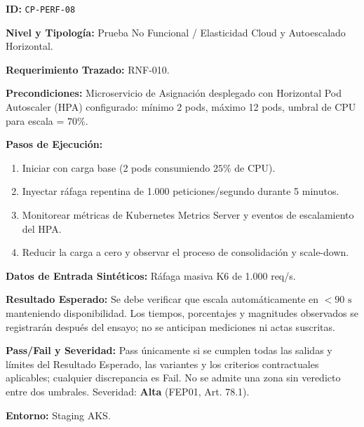 \par\noindent\textbf{ID:} \texttt{C\allowbreak{}P\allowbreak{}-\allowbreak{}P\allowbreak{}E\allowbreak{}R\allowbreak{}F\allowbreak{}-\allowbreak{}0\allowbreak{}8\allowbreak{}}\par
\par\noindent\textbf{Nivel y Tipología:} Prueba No Funcional / Elasticidad Cloud y Autoescalado Horizontal.\par
\par\noindent\textbf{Requerimiento Trazado:} RNF-010.\par
\par\noindent\textbf{Precondiciones:} Microservicio de Asignación desplegado con Horizontal Pod Autoscaler (HPA) configurado: mínimo 2 pods, máximo 12 pods, umbral de CPU para escala = \(70\%\).\par
\par\noindent\textbf{Pasos de Ejecución:} \par
\begin{enumerate}
\item Iniciar con carga base (2 pods consumiendo \(25\%\) de CPU).
\item Inyectar ráfaga repentina de 1.000 peticiones/segundo durante 5 minutos.
\item Monitorear métricas de Kubernetes Metrics Server y eventos de escalamiento del HPA.
\item Reducir la carga a cero y observar el proceso de consolidación y scale-down.
\end{enumerate}
\par\noindent\textbf{Datos de Entrada Sintéticos:} Ráfaga masiva K6 de 1.000 req/s.\par
\par\noindent\textbf{Resultado Esperado:} Se debe verificar que escala automáticamente en \(< 90\text{ s}\) manteniendo disponibilidad. Los tiempos, porcentajes y magnitudes observados se registrarán después del ensayo; no se anticipan mediciones ni actas suscritas.\par
\par\noindent\textbf{Pass/Fail y Severidad:} Pass únicamente si se cumplen todas las salidas y límites del Resultado Esperado, las variantes y los criterios contractuales aplicables; cualquier discrepancia es Fail. No se admite una zona sin veredicto entre dos umbrales. Severidad: \textbf{Alta} (FEP01, Art. 78.1).\par
\par\noindent\textbf{Entorno:} Staging AKS.\par







